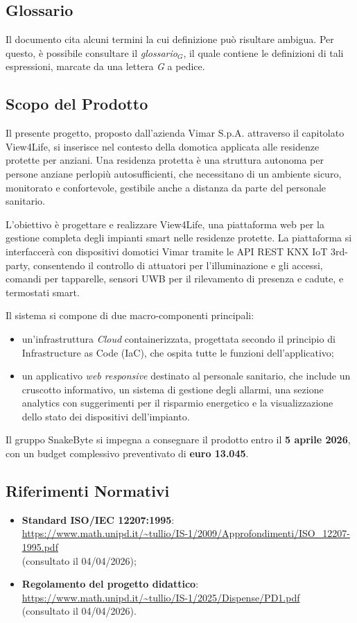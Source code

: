\documentclass[10pt, letterpaper]{article}
\begin{document}
\subsection{Glossario}
Il documento cita alcuni termini la cui definizione può risultare ambigua. Per questo, è possibile consultare il \textit{glossario$_{G}$}, il quale contiene le definizioni di tali espressioni, marcate da una lettera \textit{G} a pedice.

\subsection{Scopo del Prodotto}
Il presente progetto, proposto dall'azienda Vimar S.p.A. attraverso il capitolato View4Life, si inserisce nel contesto della domotica applicata alle residenze protette per anziani. Una residenza protetta è una struttura autonoma per persone anziane perlopiù autosufficienti, che necessitano di un ambiente sicuro, monitorato e confortevole, gestibile anche a distanza da parte del personale sanitario.

L'obiettivo è progettare e realizzare View4Life, una piattaforma web per la gestione completa degli impianti smart nelle residenze protette. La piattaforma si interfaccerà con dispositivi domotici Vimar tramite le API REST KNX IoT 3rd-party, consentendo il controllo di attuatori per l'illuminazione e gli accessi, comandi per tapparelle, sensori UWB per il rilevamento di presenza e cadute, e termostati smart.

Il sistema si compone di due macro-componenti principali:
\begin{itemize}
    \item un'infrastruttura \textit{Cloud} containerizzata, progettata secondo il principio di Infrastructure as Code (IaC), che ospita tutte le funzioni dell'applicativo;
    \item un applicativo \textit{web responsive} destinato al personale sanitario, che include un cruscotto informativo, un sistema di gestione degli allarmi, una sezione analytics con suggerimenti per il risparmio energetico e la visualizzazione dello stato dei dispositivi dell'impianto.
\end{itemize}
Il gruppo SnakeByte si impegna a consegnare il prodotto entro il \textbf{5 aprile 2026}, con un budget complessivo preventivato di \textbf{euro 13.045}.

\subsection{Riferimenti Normativi}
\begin{itemize}
    \item \textbf{Standard ISO/IEC 12207:1995}:
        \\ \url{https://www.math.unipd.it/~tullio/IS-1/2009/Approfondimenti/ISO_12207-1995.pdf}
        \\ (consultato il 04/04/2026);
    \item \textbf{Regolamento del progetto didattico}:
        \\ \url{https://www.math.unipd.it/~tullio/IS-1/2025/Dispense/PD1.pdf}
        \\ (consultato il 04/04/2026).
\end{itemize}
\end{document}
